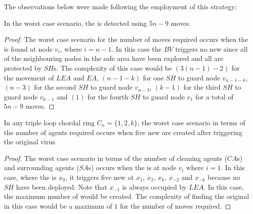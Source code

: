 \noindent The observations below were made following the employment of this strategy:

\begin{theorem}
In the worst case scenario, the \bv is detected using $5n-9$ moves.
 
\end{theorem}
\begin{proof}
The worst case scenario for the number of moves required occurs when the \bv  is found at node $v_i$, where $i=n-1$. 
  In this case the $BV$ triggers no new \bvs since all  of the neighbouring nodes in the safe area have been explored and all are protected by $SH$s.
% 
 The complexity of this case would be $(3(n-1)-2)$ for the movement of $LEA$ and $EA$, $(n-1-k)$ for one $SH$ to guard node $v_{n-1-k}$, $(n-3)$ for the second $SH$ to guard node $v_{n-3}$, $(k-1)$ for the third $SH$ to guard node $v_{k-1}$ and $(1)$ for the fourth $SH$ to guard node $v_{1}$ for a total of $5n-9$ moves.
\end{proof}
\begin{theorem}
In any triple loop chordal ring $C_n=\{1,2,k\}$, the worst case scenario in terms of the number of agents required occurs when five new \bvs are created after triggering the original virus.
\end{theorem}
\begin{proof}
The worst case scenario in terms of the number of cleaning agents ($CA$s) and surrounding agents ($SA$s) occurs when the \bv is at node $v_i$ where $ i =1$. In this case, where the \bv is $x_0$, it  triggers five new \bvs at $x_1$, $x_2$, $x_k$, $x_{-2}$ and $x_{-k}$ because no $SH$ have been deployed. Note that  $x_{-1} $ is always occupied by $LEA$. In this case, the maximum number of  \bvs would be created.
The complexity of  finding the original \bv in this case  would be a maximum of  $1$ for the number of moves required.
\end{proof}




